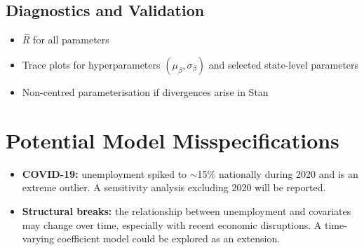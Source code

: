\documentclass[11pt]{article}
\begin{document}
\subsection{Diagnostics and Validation}

\begin{itemize}[noitemsep]
  \item $\hat{R}$ for all parameters
  \item Trace plots for hyperparameters $(\mu_\beta, \sigma_\beta)$ and
        selected state-level parameters
  \item Non-centred parameterisation if divergences arise in Stan
\end{itemize}

\section{Potential Model Misspecifications}

\begin{itemize}
  \item \textbf{COVID-19:} unemployment spiked to $\sim$15\%
        nationally during 2020 and is an extreme outlier. A sensitivity analysis excluding 2020 will be reported.
  \item \textbf{Structural breaks:} the relationship between unemployment and covariates may change over time, especially with recent economic disruptions. 
  A time-varying coefficient model could be explored as an extension.
\end{itemize}
\end{document}
